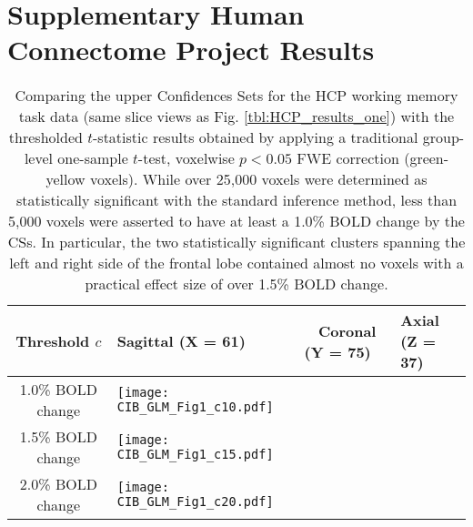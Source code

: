 \section{Supplementary Human Connectome Project Results}
\label{sec:supp_CI_figs}

\begin{table}[htbp]
\hspace*{-0.5cm}
\begin{adjustbox}{center}
\centering
    \begin{tabular}{cm{50mm}m{50mm}m{50mm}}
       \toprule
         Threshold $c$ & \hspace{1.4cm} Sagittal (X = 61) & \ \hspace{1.2cm} Coronal (Y = 75) & \hspace{1.0cm} Axial (Z = 37)\\
        \midrule
        1.0\% BOLD change & \texttt{[image: CIB\_GLM\_Fig1\_c10.pdf]}\\
        1.5\% BOLD change & \texttt{[image: CIB\_GLM\_Fig1\_c15.pdf]}\\
        2.0\% BOLD change & \texttt{[image: CIB\_GLM\_Fig1\_c20.pdf]}\\
        \bottomrule
    \end{tabular}
\end{adjustbox}
    \caption{Comparing the upper Confidences Sets for the HCP working memory task data (same slice views as Fig. \ref{tbl:HCP_results_one}) with the thresholded $t$-statistic results obtained by applying a traditional group-level one-sample $t$-test, voxelwise $p < 0.05$ FWE correction (green-yellow voxels). While over 25,000 voxels were determined as statistically significant with the standard inference method, less than 5,000 voxels were asserted to have at least a 1.0\% BOLD change by the CSs. In particular, the two statistically significant clusters spanning the left and right side of the frontal lobe contained almost no voxels with a practical effect size of over 1.5\% BOLD change.}
    \label{tbl:Supp_HCP_results_one}
\end{table}

